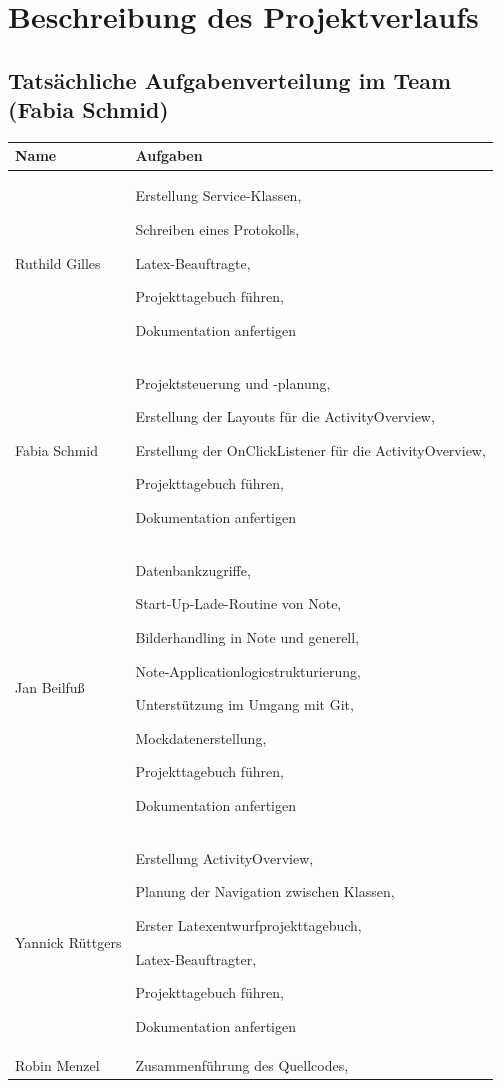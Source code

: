 \section{Beschreibung des Projektverlaufs}
\label{instal}

\subsection{Tatsächliche Aufgabenverteilung im Team (Fabia Schmid)}

\begin{longtable}{|p{4cm}|p{10cm}|}
\hline
{\textbf{Name}} & {\textbf{Aufgaben}}  \\ \hline
Ruthild Gilles & Erstellung Service-Klassen,

Schreiben eines Protokolls,

Latex-Beauftragte,

Projekttagebuch führen, 

Dokumentation anfertigen \\ \hline 
Fabia Schmid  & Projektsteuerung und -planung, 

Erstellung der Layouts für die ActivityOverview,  

Erstellung der OnClickListener für die ActivityOverview,  

Projekttagebuch führen, 

Dokumentation anfertigen \\ \hline

Jan Beilfuß & Datenbankzugriffe, 

Start-Up-Lade-Routine von Note, 

Bilderhandling in Note und generell, 

Note-Applicationlogicstrukturierung, 

Unterstützung im Umgang mit Git, 

Mockdatenerstellung,

Projekttagebuch führen, 

Dokumentation anfertigen \\ \hline
Yannick Rüttgers & Erstellung ActivityOverview,  

Planung der Navigation zwischen Klassen, 

Erster Latexentwurfprojekttagebuch, 

Latex-Beauftragter, 

Projekttagebuch führen, 

Dokumentation anfertigen \\ \hline
Robin Menzel & Zusammenführung des Quellcodes, 


\end{longtable}
